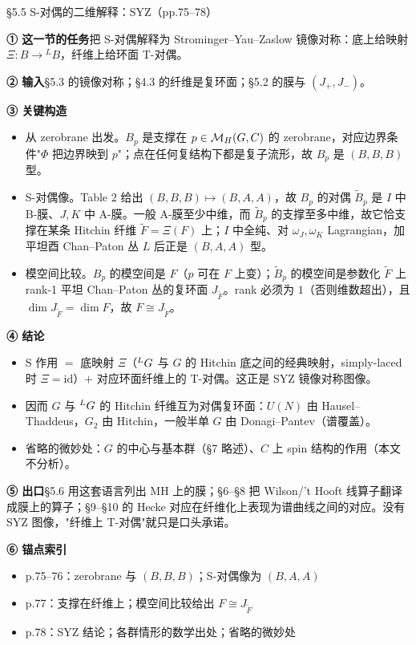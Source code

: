 \begin{kcard}{§5.5 S-对偶的二维解释：SYZ（pp.75--78）}

\noindent\textbf{① 这一节的任务}\quad 把 S-对偶解释为 Strominger--Yau--Zaslow 镜像对称：底上给映射 $\Xi:B\to{}^LB$，纤维上给环面 T-对偶。\pA{}

\noindent\textbf{② 输入}\quad \S5.3 的镜像对称；\S4.3 的纤维是复环面；\S5.2 的膜与 $(J_+,J_-)$。

\noindent\textbf{③ 关键构造}\quad
\begin{itemize}
\item 从 zerobrane 出发。$B_p$ 是支撑在 $p\in\mathcal{M}_H(G,C)$ 的 zerobrane，对应边界条件"$\Phi$ 把边界映到 $p$"；点在任何复结构下都是复子流形，故 $B_p$ 是 $(B,B,B)$ 型。\pA{}
\item S-对偶像。Table 2 给出 $(B,B,B)\mapsto(B,A,A)$，故 $B_p$ 的对偶 $\tilde B_p$ 是 $I$ 中 B-膜、$J,K$ 中 A-膜。一般 A-膜至少中维，而 $\tilde B_p$ 的支撑至多中维，故它恰支撑在某条 Hitchin 纤维 $\tilde F=\Xi(F)$ 上；$I$ 中全纯、对 $\omega_J,\omega_K$ Lagrangian，加平坦酉 Chan--Paton 丛 $L$ 后正是 $(B,A,A)$ 型。\pA{}
\item 模空间比较。$B_p$ 的模空间是 $F$（$p$ 可在 $F$ 上变）；$\tilde B_p$ 的模空间是参数化 $\tilde F$ 上 rank-1 平坦 Chan--Paton 丛的复环面 $J_{\tilde F}$。rank 必须为 $1$（否则维数超出），且 $\dim J_{\tilde F}=\dim F$，故 $F\cong J_{\tilde F}$。\pA{}
\end{itemize}

\noindent\textbf{④ 结论}\quad
\begin{itemize}
\item S 作用 $=$ 底映射 $\Xi$（${}^{L}G$ 与 $G$ 的 Hitchin 底之间的经典映射，simply-laced 时 $\Xi=\mathrm{id}$）$+$ 对应环面纤维上的 T-对偶。这正是 SYZ 镜像对称图像。\pA{}
\item 因而 $G$ 与 ${}^{L}G$ 的 Hitchin 纤维互为对偶复环面：$U(N)$ 由 Hausel--Thaddeus，$G_2$ 由 Hitchin，一般半单 $G$ 由 Donagi--Pantev（谱覆盖）。\pA{}
\item 省略的微妙处：$G$ 的中心与基本群（\S7 略述）、$C$ 上 spin 结构的作用（本文不分析）。\pA{}
\end{itemize}

\noindent\textbf{⑤ 出口}\quad \S5.6 用这套语言列出 MH 上的膜；\S6--\S8 把 Wilson/'t Hooft 线算子翻译成膜上的算子；\S9--\S10 的 Hecke 对应在纤维化上表现为谱曲线之间的对应。没有 SYZ 图像，"纤维上 T-对偶"就只是口头承诺。\pB{}

\noindent\textbf{⑥ 锚点索引}\quad
\begin{itemize}
\item p.75--76：zerobrane 与 $(B,B,B)$；S-对偶像为 $(B,A,A)$
\item p.77：支撑在纤维上；模空间比较给出 $F\cong J_{\tilde F}$
\item p.78：SYZ 结论；各群情形的数学出处；省略的微妙处
\end{itemize}
\end{kcard}

